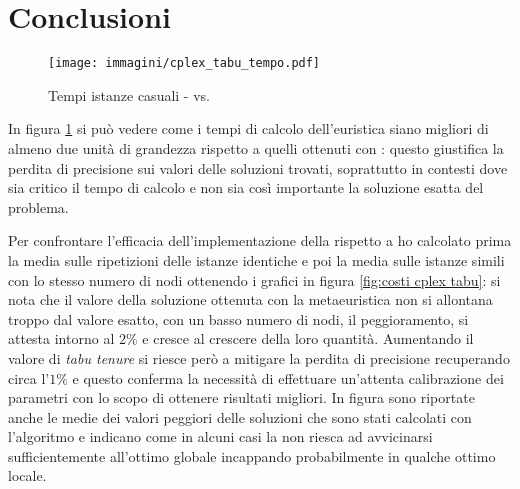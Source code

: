 \section{Conclusioni}

\begin{figure}[htb]
	\centering
	\texttt{[image: immagini/cplex\_tabu\_tempo.pdf]}
	\caption{Tempi istanze casuali -  vs. \tabu}
	\label{fig:tempi cplex tabu}
\end{figure}

In figura \ref{fig:tempi cplex tabu} si può vedere come i tempi di calcolo dell'euristica \tabu siano migliori di almeno due unità di grandezza rispetto a quelli ottenuti con : questo giustifica la perdita di precisione sui valori delle soluzioni trovati, soprattutto in contesti dove sia critico il tempo di calcolo e non sia così importante la soluzione esatta del problema.

Per confrontare l'efficacia dell'implementazione della \tabu rispetto a  ho calcolato prima la media sulle ripetizioni delle istanze identiche e poi la media sulle istanze simili con lo stesso numero di nodi ottenendo i grafici in figura \ref{fig:costi cplex tabu}: si nota che il valore della soluzione ottenuta con la metaeuristica non si allontana troppo dal valore esatto, con un basso numero di nodi, il peggioramento, si attesta intorno al $2\%$ e cresce al crescere della loro quantità.
Aumentando il valore di \emph{tabu tenure} si riesce però a mitigare la perdita di precisione recuperando circa l'$1\%$ e questo conferma la necessità di effettuare un'attenta calibrazione dei parametri con lo scopo di ottenere risultati migliori.
In figura sono riportate anche le medie dei valori peggiori delle soluzioni che sono stati calcolati con l'algoritmo e indicano come in alcuni casi la \tabu non riesca ad avvicinarsi sufficientemente all'ottimo globale incappando probabilmente in qualche ottimo locale.

